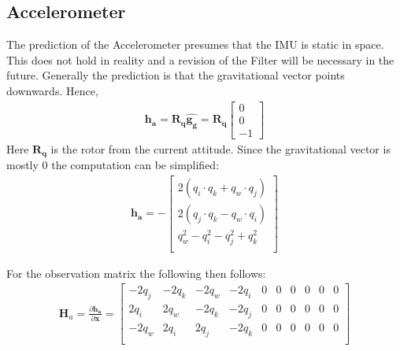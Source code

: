 \documentclass[10pt,a4paper]{article}
\newcommand{\M}[1]{\mathbf{#1}}
\newcommand{\V}[1]{\mathbf{#1}}
\newcommand{\Vh}[1]{\mathbf{\hat{#1}}}
\begin{document}
\subsection{Accelerometer}
The prediction of the Accelerometer presumes that the IMU is static in space.
This does not hold in reality and a revision of the Filter will be necessary in the future.
Generally the prediction is that the gravitational vector points downwards.
Hence,
\begin{align}
  \V {h_a} =  \M {R_q} \Vh{g_g} = \M {R_q}
  \begin{bmatrix}
    0 \\ 0 \\ -1
  \end{bmatrix}
\end{align}
Here $\M {R_q}$ is the rotor from the current attitude.
Since the gravitational vector is mostly 0 the computation can be simplified:
\begin{align}
  \V {h_a} = - \begin{bmatrix}
    2 (q_i \cdot q_k + q_w \cdot q_j) \\
    2 (q_j \cdot q_k - q_w \cdot q_i) \\
    q_w^2 - q_i^2 - q_j^2 + q_k^2 \\
  \end{bmatrix}
\end{align}

For the observation matrix the following then follows:
\begin{align}
 \M H_a =  \frac { \partial \V {h_a}}  {\partial \V x}  =
  \begin{bmatrix}
    - 2 q_j & - 2 q_k & - 2 q_w & - 2 q_i & 0 & 0 & 0 & 0 & 0 & 0 \\
    2 q_i & 2 q_w & - 2 q_k & - 2 q_j & 0 & 0 & 0 & 0 & 0 & 0 \\
    - 2 q_w & 2 q_i & 2 q_j & - 2 q_k & 0 & 0 & 0 & 0 & 0 & 0 \\
  \end{bmatrix}
\end{align}
\end{document}
